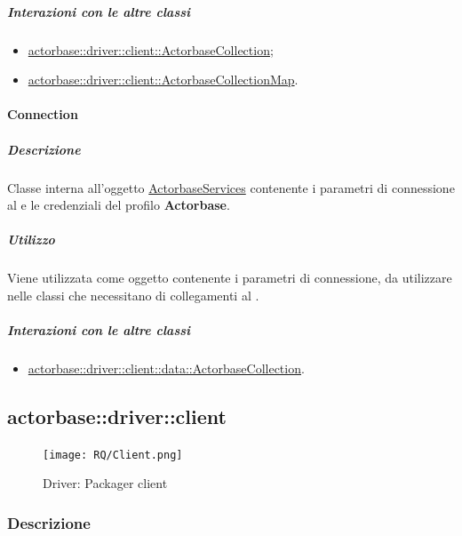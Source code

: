 \documentclass{scalatekids-article}
\begin{document}
\subparagraph{Interazioni con le altre classi}

\begin{itemize}
\item \hyperref[sec:actorbase::driver::client::ActorbaseCollection]{actorbase::driver::client::ActorbaseCollection};
\item \hyperref[sec:actorbase::driver::client::ActorbaseCollection]{actorbase::driver::client::ActorbaseCollectionMap}.
\end{itemize}

\paragraph{Connection}
\label{sec:actorbase::driver::Connection}

\subparagraph{Descrizione}

Classe interna all'oggetto
\hyperref[sec:actorbase::driver::ActorbaseServices]{ActorbaseServices} contenente i
parametri di connessione al  e le credenziali del profilo \textbf{Actorbase}.

\subparagraph{Utilizzo}

Viene utilizzata come oggetto contenente i parametri di connessione, da
utilizzare nelle classi che necessitano di collegamenti al .

\subparagraph{Interazioni con le altre classi}

\begin{itemize}
\item \hyperref[sec:actorbase::driver::client::data::ActorbaseCollection]{actorbase::driver::client::data::ActorbaseCollection}.
\end{itemize}

\subsection{actorbase::driver::client}
\label{sec:actorbase::driver::client}

\begin{figure}[H]
  \begin{center}
    \texttt{[image: RQ/Client.png]}
    \caption{Driver: Packager client}
  \end{center}
\end{figure}

\subsubsection{Descrizione}
\end{document}

